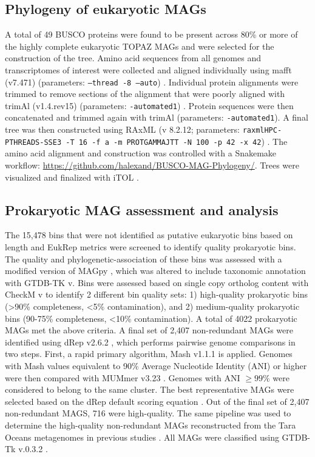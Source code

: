 \documentclass[12pt]{article}
\numberwithin{equation}{section}
\begin{document}
\subsection*{Phylogeny of eukaryotic MAGs} 
A total of 49 BUSCO proteins were found to be present across 80\% or more of the highly complete eukaryotic TOPAZ MAGs and were selected for the construction of the tree. Amino acid sequences from all genomes and transcriptomes of interest were collected and aligned individually using mafft (v7.471) (parameters: \texttt{--thread -8 –auto}) \citep{Katoh2013MAFFT}. Individual protein alignments were trimmed to remove sections of the alignment that were poorly aligned with trimAl (v1.4.rev15) (parameters: \texttt{-automated1}) \citep{Capella-Gutierrez2009trimAl}. Protein sequences were then concatenated and trimmed again with trimAl (parameters: \texttt{-automated1}). A final tree was then constructed using RAxML (v 8.2.12; parameters: \texttt{raxmlHPC-PTHREADS-SSE3 -T 16 -f a -m PROTGAMMAJTT -N 100 -p 42 -x 42}) \citep{Stamatakis2014RAxML}. The amino acid alignment and construction was controlled with a Snakemake workflow: \url{https://github.com/halexand/BUSCO-MAG-Phylogeny/}. Trees were visualized and finalized with iTOL \citep{Letunic2016Interactive}. 

\subsection*{Prokaryotic MAG assessment and analysis} 
The 15,478 bins that were not identified as putative eukaryotic bins based on length and EukRep metrics were screened to identify quality prokaryotic bins. The quality and phylogenetic-association of these bins was assessed with a modified version of MAGpy \citep{Stewart2019MAGpy}, which was altered to include taxonomic annotation with GTDB-TK v\citep{Stewart2019MAGpy}. Bins were assessed based on single copy ortholog content with CheckM v \citep{Parks2015CheckM} to identify 2 different bin quality sets: 1) high-quality prokaryotic bins (>90\% completeness, <5\% contamination), and 2) medium-quality prokaryotic bins (90-75\% completeness, <10\% contamination). A total of 4022 prokaryotic MAGs met the above criteria. A final set of 2,407 non-redundant MAGs were identified using dRep v2.6.2 \citep{Olm_2017}, which performs pairwise genome comparisons in two steps. First, a rapid primary algorithm, Mash v1.1.1 \citep{Ondov_2016} is applied. Genomes with Mash values equivalent to 90\% Average Nucleotide Identity (ANI) or higher were then compared with MUMmer v3.23 \citep{Mar_ais_2018}. Genomes with ANI $\geq99\%$ were considered to belong to the same cluster. The best representative MAGs were selected based on the dRep default scoring equation \citep{Olm_2017}. Out of the final set of 2,407 non-redundant MAGS, 716 were high-quality. The same pipeline was used to determine the high-quality non-redundant MAGs reconstructed from the Tara Oceans metagenomes in previous studies \citep{Tully2018reconstruction, Parks2017Recovery, Delmont2018Nitrogen-fixing}. All MAGs were classified using GTDB-Tk v.0.3.2 \citep{Chaumeil_2019}.
\end{document}
